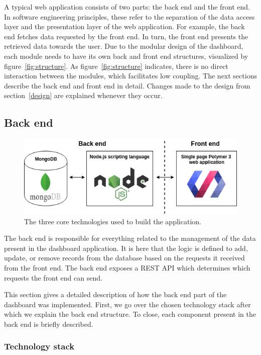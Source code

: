     A typical web application consists of two parts: the back end and the front end. In software engineering principles, these refer to the separation of the data access layer and the presentation layer of the web application. For example, the back end fetches data requested by the front end. In turn, the front end presents the retrieved data towards the user. Due to the modular design of the dashboard, each module needs to have its own back and front end structures, visualized by figure~\ref{fig:structure}. As figure~\ref{fig:structure} indicates, there is no direct interaction between the modules, which facilitates low coupling. The next sections describe the back end and front end in detail. Changes made to the design from section~\ref{design} are explained whenever they occur.

    \subsection{Back end}

    \begin{figure}[!t]
        \centering
        \includegraphics[width=1\textwidth]{chapters/4_implementation/tech}
        \caption{The three core technologies used to build the application.}\label{fig:tech}
    \end{figure}

    The back end is responsible for everything related to the management of the data present in the dashboard application. It is here that the logic is defined to add, update, or remove records from the database based on the requests it received from the front end. The back end exposes a REST API which determines which requests the front end can send.

    This section gives a detailed description of how the back end part of the dashboard was implemented. First, we go over the chosen technology stack after which we explain the back end structure. To close, each component present in the back end is briefly described.

        \subsubsection{Technology stack}

